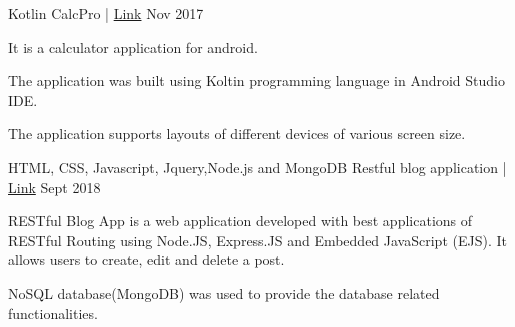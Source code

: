 \begin{cventries}
{\begin{cvitems}
      \end{cvitems}
      }
  \vspace{0.4 cm}
    \cventry
    {\textnormal{Kotlin}} %
    {CalcPro | \href{https://github.com/Rpmalukani22/CALCPRO-app}{ Link}} %
    { } %
    {Nov 2017} %
    {
      \begin{cvitems} %
        \item {It is a calculator application for android.}
        \item{The application was built using Koltin programming language in Android Studio IDE.}
        \item{The application supports layouts of different devices of various screen size.}
      \end{cvitems}
    }

 \cventry
    {\textnormal{HTML, CSS, Javascript, Jquery,Node.js and MongoDB}} %
   { Restful blog application | \href{https://github.com/Rpmalukani22/RESTful-Blog-app}{ Link}} %
    { } %
    {Sept 2018} %
    {
      \begin{cvitems} %
        \item { RESTful Blog App is a web application developed with best applications of RESTful Routing using Node.JS, Express.JS and Embedded JavaScript (EJS). It allows users to create, edit and delete a post. }
        \item{NoSQL database(MongoDB) was used to provide the database related functionalities.}
      \end{cvitems}
    }


\end{cventries}
